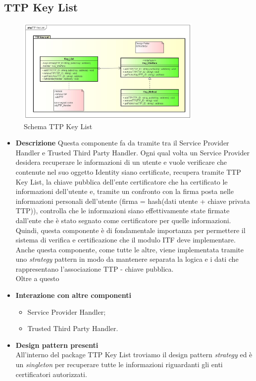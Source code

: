 \subsection{TTP Key List}
\begin{figure}[!h]
	\centering
	\includegraphics[width=0.8\textwidth]{immagini/ttpkeylist}
	\caption{Schema TTP Key List}
\end{figure}
\begin{itemize}
	\item \textbf{Descrizione}
	Questa componente fa da tramite tra il Service Provider Handler e Trusted Third Party Handler.
	Ogni qual volta un Service Provider desidera recuperare le informazioni di un utente e vuole verificare che contenute nel suo oggetto Identity siano certificate, recupera tramite TTP Key List, la chiave pubblica dell'ente certificatore che ha certificato le informazioni dell'utente e, tramite un confronto con la firma posta nelle informazioni personali dell'utente (firma = hash(dati utente + chiave privata \gls{TTP})), controlla che le informazioni siano effettivamente state firmate dall'ente che è stato segnato come certificatore per quelle informazioni.\\
	Quindi, questa componente è di fondamentale importanza per permettere il sistema di verifica e certificazione che il modulo \gls{ITF} deve implementare.\\
	Anche questa componente, come tutte le altre, viene implementata tramite uno \textit{strategy} pattern in modo da mantenere separata la logica e i dati che rappresentano l'associazione \gls{TTP} - chiave pubblica.\\
	Oltre a questo
	\item \textbf{Interazione con altre componenti}
	\begin{itemize}
		\item Service Provider Handler;
		\item Trusted Third Party Handler.
	\end{itemize}
	\item \textbf{Design pattern presenti}\\
	All'interno del package TTP Key List troviamo il design pattern \textit{strategy} ed è un \textit{singleton} per recuperare tutte le informazioni riguardanti gli enti certificatori autorizzati.
\end{itemize}
